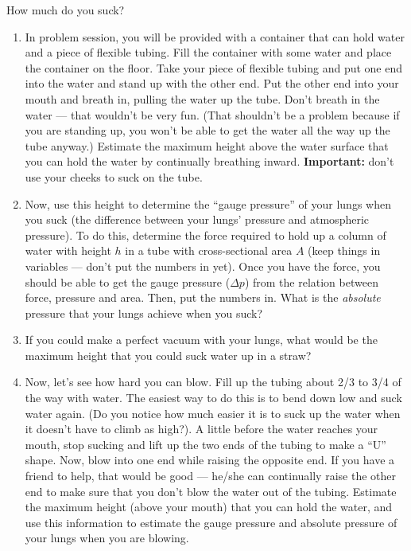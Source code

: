 \begin{aproblem}{How much do you suck?}
  \begin{enumerate}
  \item In problem session, you will be provided with a container that
    can hold water and a piece of flexible tubing.  Fill the container
    with some water and place the container on the floor.  Take your
    piece of flexible tubing and put one end into the water and stand
    up with the other end.  Put the other end into your mouth and
    breath in, pulling the water up the tube.  Don't breath in the
    water --- that wouldn't be very fun. (That shouldn't be a problem
    because if you are standing up, you won't be able to get the water
    all the way up the tube anyway.)  Estimate the maximum height
    above the water surface that you can hold the water by continually
    breathing inward.  {\bf Important:} don't use your cheeks to suck
    on the tube.

  \item Now, use this height to determine the ``gauge pressure'' of
    your lungs when you suck (the difference between your lungs'
    pressure and atmospheric pressure).  To do this, determine the
    force required to hold up a column of water with height $h$ in a
    tube with cross-sectional area $A$ (keep things in variables ---
    don't put the numbers in yet).  Once you have the force, you
    should be able to get the gauge pressure ($\Delta p$) from the
    relation between force, pressure and area.  Then, put the numbers
    in.  What is the {\em absolute} pressure that your lungs achieve
    when you suck?

  \item If you could make a perfect vacuum with your lungs, what would
    be the maximum height that you could suck water up in a straw?

  \item Now, let's see how hard you can blow.  Fill up the tubing
    about 2/3 to 3/4 of the way with water.  The easiest way to do
    this is to bend down low and suck water again. (Do you notice how
    much easier it is to suck up the water when it doesn't have to
    climb as high?).  A little before the water reaches your mouth,
    stop sucking and lift up the two ends of the tubing to make a
    ``U'' shape.  Now, blow into one end while raising the opposite
    end.  If you have a friend to help, that would be good --- he/she
    can continually raise the other end to make sure that you don't
    blow the water out of the tubing.  Estimate the maximum height
    (above your mouth) that you can hold the water, and use this
    information to estimate the gauge pressure and absolute pressure
    of your lungs when you are blowing.


\end{enumerate}
\end{aproblem}
